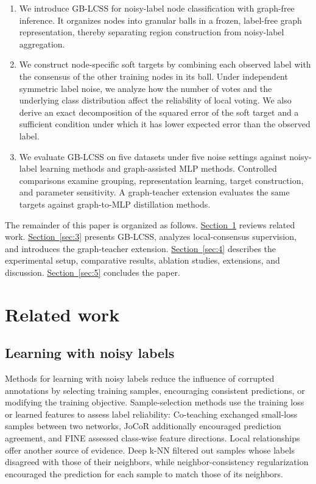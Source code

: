 \documentclass[10pt,letterpaper,nopreprintline]{elsarticle}
\theoremstyle{definition}
\theoremstyle{plain}
\begin{document}
\begin{enumerate}[label=(\arabic*)]
\item We introduce GB-LCSS for noisy-label node classification with graph-free inference. It organizes nodes into granular balls in a frozen, label-free graph representation, thereby separating region construction from noisy-label aggregation.
\item We construct node-specific soft targets by combining each observed label with the consensus of the other training nodes in its ball. Under independent symmetric label noise, we analyze how the number of votes and the underlying class distribution affect the reliability of local voting. We also derive an exact decomposition of the squared error of the soft target and a sufficient condition under which it has lower expected error than the observed label.
\item We evaluate GB-LCSS on five datasets under five noise settings against noisy-label learning methods and graph-assisted MLP methods. Controlled comparisons examine grouping, representation learning, target construction, and parameter sensitivity. A graph-teacher extension evaluates the same targets against graph-to-MLP distillation methods.
\end{enumerate}

The remainder of this paper is organized as follows. \hyperref[sec:2]{Section~\ref*{sec:2}} reviews related work. \hyperref[sec:3]{Section~\ref*{sec:3}} presents GB-LCSS, analyzes local-consensus supervision, and introduces the graph-teacher extension. \hyperref[sec:4]{Section~\ref*{sec:4}} describes the experimental setup, comparative results, ablation studies, extensions, and discussion. \hyperref[sec:5]{Section~\ref*{sec:5}} concludes the paper.

\section{Related work}\label{sec:2}

\subsection{Learning with noisy labels}\label{sec:2.1}

Methods for learning with noisy labels reduce the influence of corrupted annotations by selecting training samples, encouraging consistent predictions, or modifying the training objective. Sample-selection methods use the training loss or learned features to assess label reliability: Co-teaching \cite{ref17} exchanged small-loss samples between two networks, JoCoR \cite{ref18} additionally encouraged prediction agreement, and FINE \cite{ref20} assessed class-wise feature directions. Local relationships offer another source of evidence. Deep k-NN \cite{ref11} filtered out samples whose labels disagreed with those of their neighbors, while neighbor-consistency regularization \cite{ref10} encouraged the prediction for each sample to match those of its neighbors.
\end{document}
